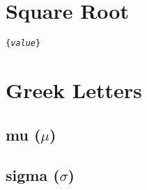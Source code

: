 \documentclass{tufte-handout}
\begin{document}
\vspace{3mm}
\section{Square Root}
\texttt{\{\textit{value}\}}

\vspace{5mm}
\section{Greek Letters}
\subsection{mu ($\mu$)}

\vspace{3mm}
\subsection{sigma ($\sigma$)}

\end{document}
